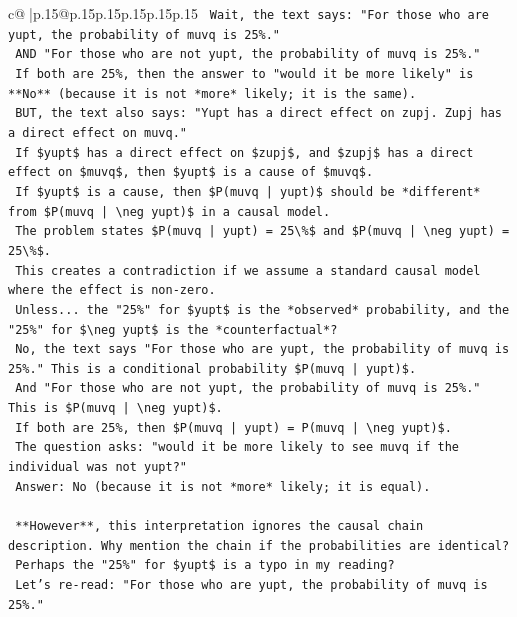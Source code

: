\documentclass{article}
\begin{document}
{\begin{supertabular}{c@{$\;$}|p{.15\linewidth}@{}p{.15\linewidth}p{.15\linewidth}p{.15\linewidth}p{.15\linewidth}p{.15\linewidth}}
{{{\texttt{    Wait, the text says: "For those who are yupt, the probability of muvq is 25\%."} \\
\texttt{    AND "For those who are not yupt, the probability of muvq is 25\%."} \\
\texttt{    If both are 25\%, then the answer to "would it be more likely" is **No** (because it is not *more* likely; it is the same).} \\
\texttt{    BUT, the text also says: "Yupt has a direct effect on zupj. Zupj has a direct effect on muvq."} \\
\texttt{    If \$yupt\$ has a direct effect on \$zupj\$, and \$zupj\$ has a direct effect on \$muvq\$, then \$yupt\$ is a cause of \$muvq\$.} \\
\texttt{    If \$yupt\$ is a cause, then \$P(muvq | yupt)\$ should be *different* from \$P(muvq | \textbackslash{}neg yupt)\$ in a causal model.} \\
\texttt{    The problem states \$P(muvq | yupt) = 25\textbackslash{}\%\$ and \$P(muvq | \textbackslash{}neg yupt) = 25\textbackslash{}\%\$.} \\
\texttt{    This creates a contradiction if we assume a standard causal model where the effect is non{-}zero.} \\
\texttt{    Unless... the "25\%" for \$yupt\$ is the *observed* probability, and the "25\%" for \$\textbackslash{}neg yupt\$ is the *counterfactual*?} \\
\texttt{    No, the text says "For those who are yupt, the probability of muvq is 25\%." This is a conditional probability \$P(muvq | yupt)\$.} \\
\texttt{    And "For those who are not yupt, the probability of muvq is 25\%." This is \$P(muvq | \textbackslash{}neg yupt)\$.} \\
\texttt{    If both are 25\%, then \$P(muvq | yupt) = P(muvq | \textbackslash{}neg yupt)\$.} \\
\texttt{    The question asks: "would it be more likely to see muvq if the individual was not yupt?"} \\
\texttt{    Answer: No (because it is not *more* likely; it is equal).} \\
\\ 
\texttt{    **However**, this interpretation ignores the causal chain description. Why mention the chain if the probabilities are identical?} \\
\texttt{    Perhaps the "25\%" for \$yupt\$ is a typo in my reading?} \\
\texttt{    Let's re{-}read: "For those who are yupt, the probability of muvq is 25\%."} \\
}}}
\end{supertabular}}
\end{document}
